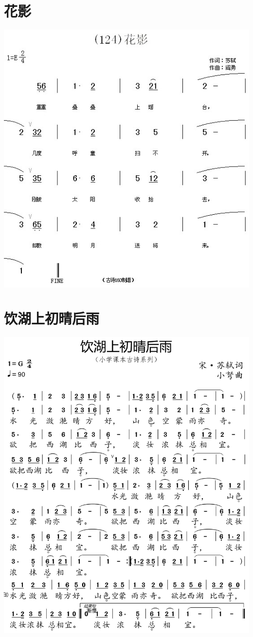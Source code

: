 \documentclass[cn,pad,twocol]{elegantbook}
\begin{document}
\section{花影}                      \includegraphics[width=\textwidth]{dongxiao/20200627-苏轼-花影.jpg} 
\section{饮湖上初晴后雨}            \includegraphics[width=\textwidth]{dongxiao/20200627-苏轼-饮湖上初晴后雨.jpg} 
\end{document}
